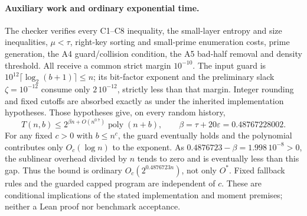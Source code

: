 \paragraph{Auxiliary work and ordinary exponential time.}
The checker verifies every C1--C8 inequality, the small-layer entropy
and size inequalities, $\mu<\tau$, right-key sorting and small-prime
enumeration costs, prime generation, the A4 guard/collision condition,
the A5 bad-half removal and density threshold. All receive a common
strict margin $10^{-10}$. The input guard is
$10^{12}\lceil\log_2(b+1)\rceil\le n$; its bit-factor exponent and
the preliminary slack $\zeta=10^{-12}$ consume only $2\,10^{-12}$,
strictly less than that margin. Integer rounding and fixed cutoffs
are absorbed exactly as under the inherited implementation hypotheses.
Those hypotheses give, on every random history,
\[
 T(n,b)\le 2^{\beta n+O(n^{0.7})}\operatorname{poly}(n+b),\qquad
 \beta=\tau+20\varepsilon=0.48767228002.
\]
For any fixed $c>0$ with $b\le n^c$, the guard eventually holds and
the polynomial contributes only $O_c(\log n)$ to the exponent.
As $0.4876723-\beta=1.998\,10^{-8}>0$, the sublinear overhead divided
by $n$ tends to zero and is eventually less than this gap.
Thus the bound is ordinary $O_c(2^{0.4876723n})$, not only $O^*$.
Fixed fallback rules and the guarded capped program are independent of
$c$. These are conditional implications of the stated implementation
and moment premises; neither a Lean proof nor benchmark acceptance.

